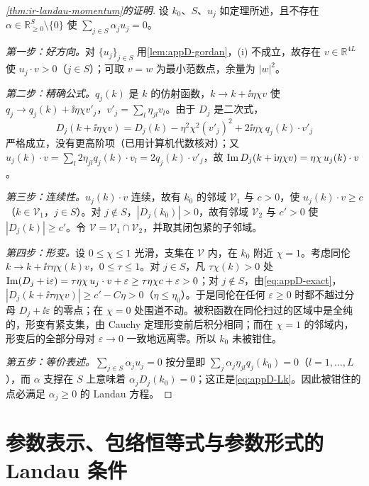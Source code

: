 \begin{proof}[\cref{thm:ir-landau-momentum}的证明]
设 $k_0$、$S$、$u_j$ 如定理所述，且不存在 $\alpha\in\mathbb R^S_{\ge0}\setminus\{0\}$ 使 $\sum_{j\in S}\alpha_ju_j=0$。

\emph{第一步：好方向。}对 $\{u_j\}_{j\in S}$ 用\cref{lem:appD-gordan}，(i) 不成立，故存在 $v\in\mathbb R^{4L}$ 使 $u_j\cdot v>0$（$j\in S$）；可取 $v=w$ 为最小范数点，余量为 $|w|^2$。

\emph{第二步：精确公式。}$q_j(k)$ 是 $k$ 的仿射函数，$k\to k+\ii\eta\chi v$ 使 $q_j\to q_j(k)+\ii\eta\chi v'_j$，$v'_j=\sum_l\eta_{jl}v_l$。由于 $D_j$ 是二次式，
\begin{equation}\label{eq:appD-exact}
D_j(k+\ii\eta\chi v)=D_j(k)-\eta^2\chi^2(v'_j)^2+2\ii\eta\chi\,q_j(k)\cdot v'_j
\end{equation}
严格成立，没有更高阶项（已用计算机代数核对）；又 $u_j(k)\cdot v=\sum_l2\eta_{jl}q_j(k)\cdot v_l=2q_j(k)\cdot v'_j$，故 $\operatorname{Im} D_j(k+\mathrm{i}\eta\chi v)=\eta\chi\,u_j(k)\cdot v$。

\emph{第三步：连续性。}$u_j(k)\cdot v$ 连续，故有 $k_0$ 的邻域 $\mathcal V_1$ 与 $c>0$，使 $u_j(k)\cdot v\ge c$（$k\in\mathcal V_1$，$j\in S$）。对 $j\notin S$，$|D_j(k_0)|>0$，故有邻域 $\mathcal V_2$ 与 $c'>0$ 使 $|D_j(k)|\ge c'$。令 $\mathcal V=\mathcal V_1\cap\mathcal V_2$，并取其闭包紧的子邻域。

\emph{第四步：形变。}设 $0\le\chi\le1$ 光滑，支集在 $\mathcal V$ 内，在 $k_0$ 附近 $\chi=1$。考虑同伦 $k\to k+\ii\tau\eta\chi(k)v$，$0\le\tau\le1$。对 $j\in S$，凡 $\tau\chi(k)>0$ 处 $\operatorname{Im}(D_j+\mathrm{i}\varepsilon)=\tau\eta\chi\,u_j\cdot v+\varepsilon\ge\tau\eta\chi c+\varepsilon>0$；对 $j\notin S$，由\cref{eq:appD-exact}，$|D_j(k+\ii\tau\eta\chi v)|\ge c'-C\eta>0$（$\eta\le\eta_0$）。于是同伦在任何 $\varepsilon\ge0$ 时都不越过分母 $D_j+\ii\varepsilon$ 的零点；在 $\chi=0$ 处围道不动。被积函数在同伦扫过的区域中是全纯的，形变有紧支集，由 Cauchy 定理形变前后积分相同；而在 $\chi=1$ 的邻域内，形变后的全部分母对 $\varepsilon\to0$ 一致地远离零。所以 $k_0$ 未被钳住。

\emph{第五步：等价表述。}$\sum_{j\in S}\alpha_ju_j=0$ 按分量即 $\sum_j\alpha_j\eta_{jl}q_j(k_0)=0$（$l=1,\dots,L$），而 $\alpha$ 支撑在 $S$ 上意味着 $\alpha_jD_j(k_0)=0$；这正是\cref{eq:appD-Lk}。因此被钳住的点必满足 $\alpha_j\ge0$ 的 Landau 方程。
\end{proof}

\section{参数表示、包络恒等式与参数形式的 Landau 条件}\label{sec:appD-alpha}

